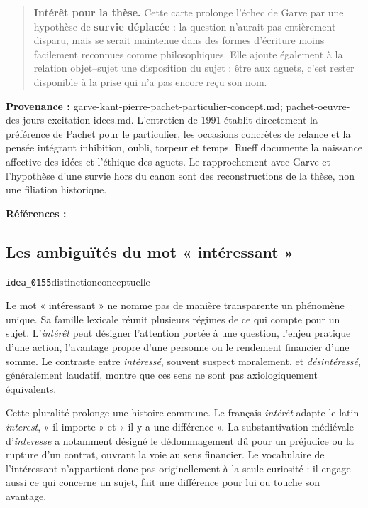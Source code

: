 \documentclass[10pt,a4paper]{article}
\begin{document}
\begin{quote}
\textbf{Intérêt pour la thèse.} Cette carte prolonge l'échec de Garve par une hypothèse de \textbf{survie déplacée} : la question n'aurait pas entièrement disparu, mais se serait maintenue dans des formes d'écriture moins facilement reconnues comme philosophiques. Elle ajoute également à la relation objet–sujet une disposition du sujet : être aux aguets, c'est rester disponible à la prise qui n'a pas encore reçu son nom.
\end{quote}
{\footnotesize\color{metadata}\textbf{Provenance :} garve-kant-pierre-pachet-particulier-concept.md; pachet-oeuvre-des-jours-excitation-idees.md. L'entretien de 1991 établit directement la préférence de Pachet pour le particulier, les occasions concrètes de relance et la pensée intégrant inhibition, oubli, torpeur et temps. Rueff documente la naissance affective des idées et l'éthique des aguets. Le rapprochement avec Garve et l'hypothèse d'une survie hors du canon sont des reconstructions de la thèse, non une filiation historique.\par}
{\footnotesize\color{metadata}\textbf{Références :} \parencite{salgas1991pachet,pachet1999oeuvre,pachet2002aguets,rueff2016promontoire,garve1779interessirende,thompson2018garve}\par}

\subsection{Les ambiguïtés du mot « intéressant »}
{\small\color{metadata} \texttt{idea\_0155}\quad\textbullet\quad distinction\quad\textbullet\quad conceptuelle\par}

Le mot « intéressant » ne nomme pas de manière transparente un phénomène unique. Sa famille lexicale réunit plusieurs régimes de ce qui compte pour un sujet. L'\emph{intérêt} peut désigner l'attention portée à une question, l'enjeu pratique d'une action, l'avantage propre d'une personne ou le rendement financier d'une somme. Le contraste entre \emph{intéressé}, souvent suspect moralement, et \emph{désintéressé}, généralement laudatif, montre que ces sens ne sont pas axiologiquement équivalents.

Cette pluralité prolonge une histoire commune. Le français \emph{intérêt} adapte le latin \emph{interest}, « il importe » et « il y a une différence ». La substantivation médiévale d'\emph{interesse} a notamment désigné le dédommagement dû pour un préjudice ou la rupture d'un contrat, ouvrant la voie au sens financier. Le vocabulaire de l'intéressant n'appartient donc pas originellement à la seule curiosité : il engage aussi ce qui concerne un sujet, fait une différence pour lui ou touche son avantage.
\end{document}
